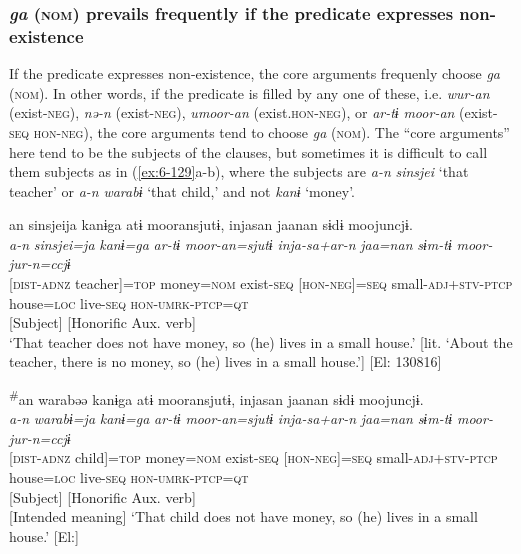 \begin{styleBeschriftung}
\subsubsection{\textit{ga} (\textsc{nom}) prevails frequently if the predicate expresses non-existence}

If the predicate expresses non-existence, the core arguments frequenly choose \textit{ga} (\textsc{nom}). In other words, if the predicate is filled by any one of these, i.e. \textit{wur-an} (exist-\textsc{neg}), \textit{nə-n} (exist-\textsc{neg}), \textit{umoor-an} (exist.\textsc{hon}-\textsc{neg}), or \textit{ar-tɨ} \textit{moor-an} (exist-\textsc{seq} \textsc{hon}-\textsc{neg}), the core arguments tend to choose \textit{ga} (\textsc{nom}). The “core arguments” here tend to be the subjects of the clauses, but sometimes it is difficult to call them subjects as in (\ref{ex:6-129}a-b), where the subjects are \textit{a-n} \textit{sinsjei} ‘that teacher’ or \textit{a-n} \textit{warabɨ} ‘that child,’ and not \textit{kanɨ} ‘money’.

\ea\label{ex:6-129}
\ea
{\TM}
\gllll an  sinsjeija  kanɨga  atɨ  mooransjutɨ,     injasan  jaanan  sɨdɨ  moojuncjɨ.\\
\textit{a-n}  \textit{sinsjei=ja}  \textit{kanɨ=ga}  \textit{ar-tɨ}  \textit{moor-an=sjutɨ}     \textit{inja-sa+ar-n}  \textit{jaa=nan}  \textit{sɨm-tɨ}  \textit{moor-jur-n=ccjɨ}\\
      {}[\textsc{dist}-\textsc{adnz}  teacher]=\textsc{top}  money=\textsc{nom}  exist-\textsc{seq}  [\textsc{hon}-\textsc{neg}]=\textsc{seq}   small-\textsc{adj}+\textsc{stv}-\textsc{ptcp}  house=\textsc{loc}  live-\textsc{seq}  \textsc{hon}-\textsc{umrk}-\textsc{ptcp}=\textsc{qt}\\
      {}[Subject]      [Honorific Aux. verb]\\
\glt ‘That teacher does not have money, so (he) lives in a small house.’
[lit. ‘About the teacher, there is no money, so (he) lives in a small house.’]       [El: 130816]

\ex

{\TM}
\glll \textsuperscript{\#}an  warabəə  kanɨga  atɨ  mooransjutɨ,   injasan  jaanan  sɨdɨ  moojuncjɨ.\\
      \textit{a-n}  \textit{warabɨ=ja}  \textit{kanɨ=ga}  \textit{ar-tɨ}  \textit{moor-an=sjutɨ}     \textit{inja-sa+ar-n}  \textit{jaa=nan}  \textit{sɨm-tɨ}  \textit{moor-jur-n=ccjɨ}\\
      {}[\textsc{dist}-\textsc{adnz}  child]=\textsc{top}  money=\textsc{nom}  exist-\textsc{seq}  [\textsc{hon}-\textsc{neg}]=\textsc{seq}      small-\textsc{adj}+\textsc{stv}-\textsc{ptcp}  house=\textsc{loc}  live-\textsc{seq}  \textsc{hon}-\textsc{umrk}-\textsc{ptcp}=\textsc{qt}\\
      {}[Subject]      [Honorific Aux. verb]\\
\glt{}      [Intended meaning] ‘That child does not have money, so (he) lives in a small house.’ [El:]
\z
\z


\end{styleBeschriftung}
